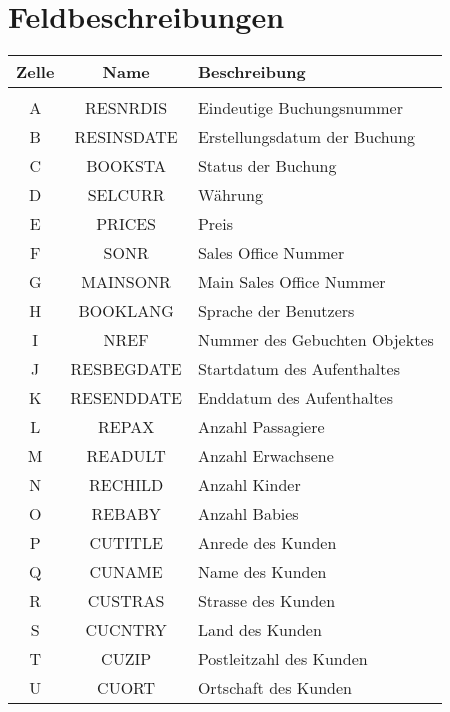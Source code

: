 
\appendix
\chapter{Feldbeschreibungen}
\label{app:feldbeschreibungen}

\begin{longtable}{ | c | c | L{10cm} |} 
	\hline 
	\bfseries Zelle & \bfseries Name & \bfseries Beschreibung \\ \hline 
	
	 \\ \hline
	A & RESNRDIS & Eindeutige Buchungsnummer \\ \hline 
	B & RESINSDATE & Erstellungsdatum der Buchung \\ \hline 
	C & BOOKSTA & Status der Buchung \\ \hline 
	D & SELCURR & Währung \\ \hline 
	E & PRICES & Preis \\ \hline 
	F & SONR & Sales Office Nummer \\ \hline 
	G & MAINSONR & Main Sales Office Nummer \\ \hline 
	H & BOOKLANG & Sprache der Benutzers \\ \hline 
	I & NREF & Nummer des Gebuchten Objektes \\ \hline 
	J & RESBEGDATE & Startdatum des Aufenthaltes \\ \hline 
	K & RESENDDATE & Enddatum des Aufenthaltes \\ \hline 
	L & REPAX & Anzahl Passagiere \\ \hline 
	M & READULT & Anzahl Erwachsene \\ \hline 
	N & RECHILD & Anzahl Kinder \\ \hline 
	O & REBABY & Anzahl Babies \\ \hline 
	P & CUTITLE & Anrede des Kunden \\ \hline 
	Q & CUNAME & Name des Kunden \\ \hline 
	R & CUSTRAS & Strasse des Kunden \\ \hline 
	S & CUCNTRY & Land des Kunden \\ \hline 
	T & CUZIP & Postleitzahl des Kunden \\ \hline 
	U & CUORT & Ortschaft des Kunden \\ \hline 
	

\end{longtable}
